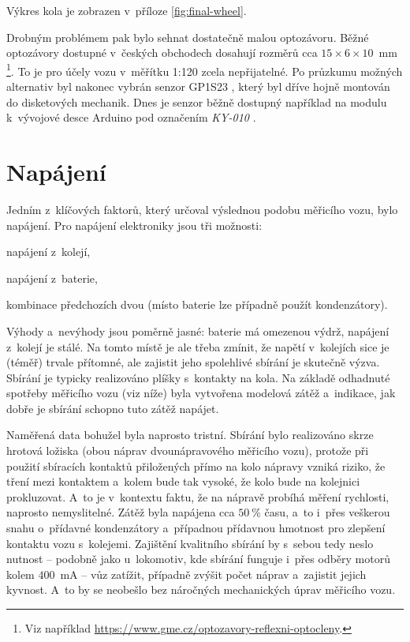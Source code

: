Výkres kola je zobrazen v~příloze \ref{fig:final-wheel}.

Drobným problémem pak bylo sehnat dostatečně malou optozávoru. Běžné optozávory
dostupné v~českých obchodech dosahují rozměrů cca $15\times6\times10$~mm
\footnote{Viz například
\url{https://www.gme.cz/optozavory-reflexni-optocleny}.}. To je pro účely vozu
v~měřítku 1:120 zcela nepřijatelné. Po
průzkumu možných alternativ byl nakonec vybrán senzor
GP1S23 \cite{gp1s23:datasheet}, který byl dříve hojně montován do disketových
mechanik. Dnes je senzor běžně dostupný například na modulu k~vývojové desce
Arduino pod označením \textit{KY-010} \cite{ky-010}.

\section{Napájení}
\label{sec:wsm-napajeni}

Jedním z~klíčových faktorů, který určoval výslednou podobu měřicího vozu, bylo
napájení. Pro napájení elektroniky jsou tři možnosti:

\begin{compactenum}
\item napájení z~kolejí,
\item napájení z~baterie,
\item kombinace předchozích dvou (místo baterie lze případně použít kondenzátory).
\end{compactenum}

Výhody a~nevýhody jsou poměrně jasné: baterie má omezenou výdrž, napájení
z~kolejí je stálé. Na tomto místě je ale třeba zmínit, že napětí v~kolejích
sice je (téměř) trvale přítomné, ale zajistit jeho spolehlivé sbírání je
skutečně výzva. Sbírání je typicky realizováno plíšky s~kontakty na kola.
Na základě odhadnuté spotřeby měřicího vozu (viz níže) byla vytvořena modelová
zátěž a~indikace, jak dobře je sbírání schopno tuto zátěž napájet.

Naměřená data bohužel byla naprosto tristní. Sbírání bylo realizováno skrze
hrotová ložiska (obou náprav dvounápravového měřicího vozu), protože při použití
sbíracích kontaktů přiložených přímo na kolo nápravy vzniká riziko, že tření mezi
kontaktem a~kolem bude tak vysoké, že kolo bude na kolejnici prokluzovat. A~to
je v~kontextu faktu, že na nápravě probíhá měření rychlosti, naprosto
nemyslitelné. Zátěž byla napájena cca $50~\%$ času, a~to i~přes veškerou snahu
o~přídavné kondenzátory a~případnou přídavnou hmotnost pro zlepšení kontaktu
vozu s~kolejemi. Zajištění kvalitního sbírání by s~sebou tedy neslo nutnost --
podobně jako u~lokomotiv, kde sbírání funguje i~přes odběry motorů kolem
$400$~mA -- vůz zatížit, případně zvýšit počet náprav a~zajistit jejich
kyvnost. A~to by se neobešlo bez náročných mechanických úprav měřicího vozu.

